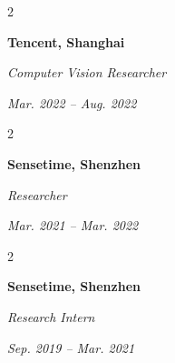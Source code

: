 \documentclass[10pt, letterpaper]{article}
\newenvironment{twocolentry}[2][]{
    \onecolentry
    \def\secondColumn{#2}
    \setcolumnwidth{\fill, 4.5 cm}
    \begin{paracol}{2}
}{
    \switchcolumn \raggedleft \secondColumn
    \end{paracol}
    \endonecolentry
} %
\let\hrefWithoutArrow\href
\renewcommand{\href}[2]{\hrefWithoutArrow{#1}{\ifthenelse{\equal{#2}{}}{ }{#2 }\raisebox{.15ex}{\footnotesize \faExternalLink*}}}
\begin{document}
        
        \begin{twocolentry}{
        \textit{Mar. 2022 -- Aug. 2022}}
            \textbf{Tencent, Shanghai} 
            
            \textit{Computer Vision Researcher}
                        
        \end{twocolentry}
        
        \begin{twocolentry}{
        \textit{Mar. 2021 -- Mar. 2022}}
            \textbf{Sensetime, Shenzhen}
            
            \textit{Researcher}
        \end{twocolentry}

        
        \begin{twocolentry}{
        \textit{Sep. 2019 -- Mar. 2021}}
             \textbf{Sensetime, Shenzhen}
             
            \textit{Research Intern}
        \end{twocolentry}
        

\end{document}
